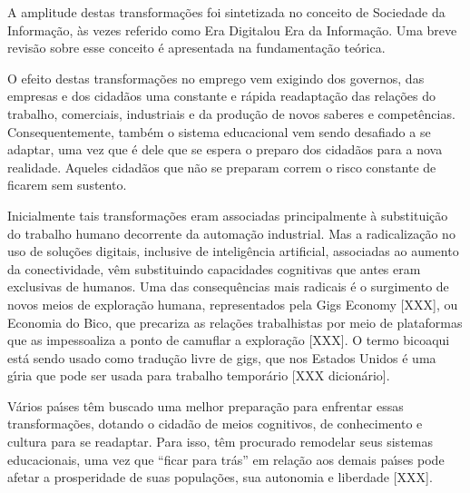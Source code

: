 \documentclass[
12pt,		%
openright,	%
twoside,  %
a4paper,			%
chapter=TITLE,		%
english,			%
french,				%
spanish,			%
brazil				%
]{USPSC-classe/USPSC_RedarTex}
\begin{document}
A amplitude destas transforma\c{c}\~oes foi sintetizada no conceito de \textquotedbl Sociedade da Informa\c{c}\~ao\textquotedbl , \`as vezes referido como \textquotedbl Era Digital\textquotedbl  ou \textquotedbl Era da Informa\c{c}\~ao\textquotedbl . Uma breve revis\~ao sobre esse conceito \'e apresentada na fundamenta\c{c}\~ao te\'orica.








O efeito destas transforma\c{c}\~oes no emprego vem exigindo dos governos, das empresas e dos cidad\~aos uma constante e r\'apida readapta\c{c}\~ao  das rela\c{c}\~oes do trabalho, comerciais, industriais e da produ\c{c}\~ao de novos saberes e compet\^encias. Consequentemente, tamb\'em o sistema educacional vem sendo desafiado a se adaptar, uma vez que \'e dele que se espera o preparo dos cidad\~aos para a nova realidade. Aqueles cidad\~aos que n\~ao se preparam correm o risco constante de ficarem sem sustento.








Inicialmente tais transforma\c{c}\~oes eram associadas principalmente \`a substitui\c{c}\~ao do trabalho humano decorrente da automa\c{c}\~ao industrial. Mas a radicaliza\c{c}\~ao no uso de solu\c{c}\~oes digitais, inclusive de intelig\^encia artificial, associadas ao aumento da conectividade, v\^em substituindo capacidades \textquotedbl cognitivas que antes eram exclusivas de humanos\textquotedbl [4]. Uma das consequ\^encias mais radicais \'e o surgimento de novos meios de explora\c{c}\~ao humana, representados pela \textquotedbl Gigs Economy [XXX], ou \textquotedbl Economia do Bico\textquotedbl , que precariza as rela\c{c}\~oes trabalhistas por meio de plataformas que as impessoaliza a ponto de camuflar a explora\c{c}\~ao [XXX]. O termo \textquotedbl bico\textquotedbl  aqui est\'a sendo usado como tradu\c{c}\~ao livre de \textquotedbl gigs\textquotedbl , que nos Estados Unidos \'e uma g\'{\i}ria que pode ser usada para trabalho tempor\'ario [XXX dicion\'ario].








V\'arios pa\'{\i}ses t\^em buscado uma melhor prepara\c{c}\~ao para enfrentar essas transforma\c{c}\~oes, dotando o cidad\~ao de meios cognitivos, de conhecimento e cultura para se readaptar. Para isso, t\^em procurado remodelar seus sistemas educacionais, uma vez que “ficar para tr\'as” em rela\c{c}\~ao aos demais pa\'{\i}ses pode afetar a prosperidade de suas popula\c{c}\~oes, sua autonomia e liberdade [XXX].
\end{document}
